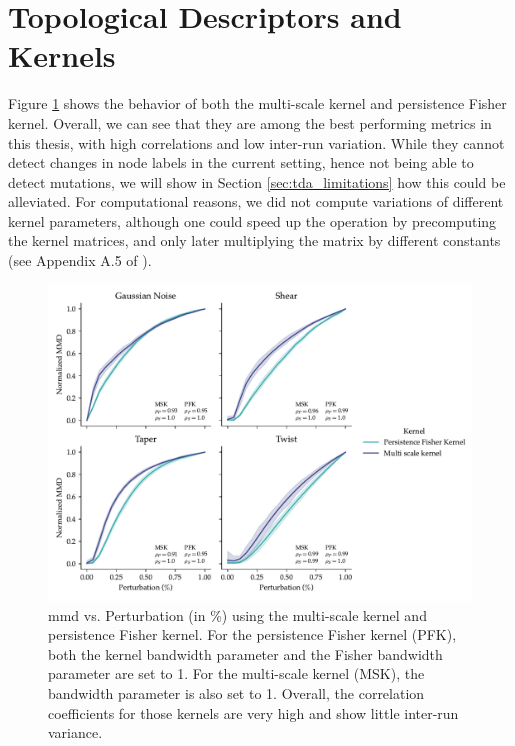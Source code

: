 \section{Topological Descriptors and Kernels}\label{sec:results_topo_kernels}

Figure \ref{fig:tda_kernels} shows the behavior of both the multi-scale kernel
and persistence Fisher kernel. Overall, we can see that they are among the best
performing metrics in this thesis, with high correlations and low inter-run
variation. While they cannot detect changes in node labels in the current
setting, hence not being able to detect mutations, we will show in Section
\ref{sec:tda_limitations} how this could be alleviated. For computational
reasons, we did not compute variations of different kernel parameters, although
one could speed up the operation by precomputing the kernel matrices, and only
later multiplying the matrix by different constants (see Appendix A.5 of
\cite{obray2022evaluation}).

\begin{figure}
  \centering
  \includegraphics[width=\textwidth]{./figures/results/res_6.pdf}
  \caption[\acrshort{mmd} using topological kernels.]{\acrshort{mmd} vs. Perturbation (in \%) using the multi-scale
kernel and persistence Fisher kernel. For the persistence Fisher kernel (PFK), both
the kernel bandwidth parameter and the Fisher bandwidth parameter are set to 1.
For the multi-scale kernel (MSK), the bandwidth parameter is also set to 1. Overall,
the correlation coefficients for those kernels are very high and show little
inter-run variance.}
  \label{fig:tda_kernels}
\end{figure}


